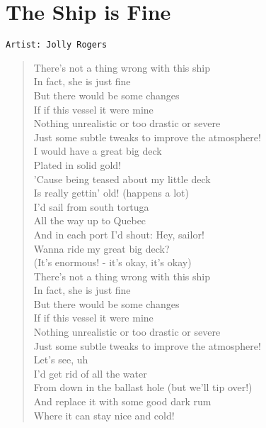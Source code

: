 \documentclass[11pt]{article}
\begin{document}
\section{The Ship is Fine}
\label{sec:org6e86493}
\begin{verbatim}
Artist: Jolly Rogers
\end{verbatim}
\begin{verse}
\vspace*{1em}
\vspace*{1em}
There's not a thing wrong with this ship\\
In fact, she is just fine\\
But there would be some changes\\
If if this vessel it were mine\\
Nothing unrealistic or too drastic or severe\\
Just some subtle tweaks to improve the atmosphere!\\
\vspace*{1em}
I would have a great big deck\\
Plated in solid gold!\\
'Cause being teased about my little deck\\
Is really gettin' old! (happens a lot)\\
I'd sail from south tortuga\\
All the way up to Quebec\\
And in each port I'd shout: Hey, sailor!\\
Wanna ride my great big deck?\\
(It's enormous! - it's okay, it's okay)\\
\vspace*{1em}
There's not a thing wrong with this ship\\
In fact, she is just fine\\
But there would be some changes\\
If if this vessel it were mine\\
Nothing unrealistic or too drastic or severe\\
Just some subtle tweaks to improve the atmosphere!\\
\vspace*{1em}
Let's see, uh\\
I'd get rid of all the water\\
From down in the ballast hole (but we'll tip over!)\\
And replace it with some good dark rum\\
Where it can stay nice and cold!\\

\end{verse}
\end{document}
